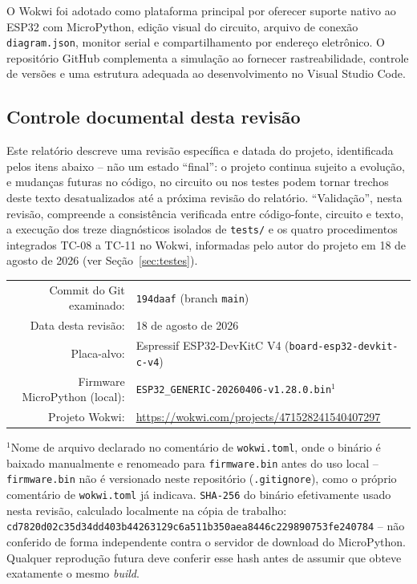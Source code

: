 \documentclass[12pt,a4paper]{article}
\newcommand{\WokwiURL}{https://wokwi.com/projects/471528241540407297}
\newcommand{\RevisionDate}{18 de agosto de 2026}
\newcommand{\RevisionCommit}{194daaf}
\newcommand{\FirmwareFile}{ESP32\_GENERIC-20260406-v1.28.0.bin}
\newcommand{\FirmwareSHA}{cd7820d02c35d34dd403b44263129c6a511b350aea8446c229890753fe240784}
\begin{document}
O Wokwi foi adotado como plataforma principal por oferecer suporte nativo ao ESP32 com MicroPython, edição visual do circuito, arquivo de conexão \texttt{diagram.json}, monitor serial e compartilhamento por endereço eletrônico. O repositório GitHub complementa a simulação ao fornecer rastreabilidade, controle de versões e uma estrutura adequada ao desenvolvimento no Visual Studio Code.

\subsection{Controle documental desta revisão}
\label{sec:controle-documental}

Este relatório descreve uma revisão específica e datada do projeto, identificada pelos itens abaixo -- não um estado \enquote{final}: o projeto continua sujeito a evolução, e mudanças futuras no código, no circuito ou nos testes podem tornar trechos deste texto desatualizados até a próxima revisão do relatório. \enquote{Validação}, nesta revisão, compreende a consistência verificada entre código-fonte, circuito e texto, a execução dos treze diagnósticos isolados de \texttt{tests/} e os quatro procedimentos integrados TC-08 a TC-11 no Wokwi, informadas pelo autor do projeto em 18 de agosto de 2026 (ver Seção~\ref{sec:testes}).

\begin{center}
\begin{tabular}{rl}
  \toprule
  Commit do Git examinado: & \texttt{\RevisionCommit} (branch \texttt{main}) \\
  Data desta revisão: & \RevisionDate \\
  Placa-alvo: & Espressif ESP32-DevKitC V4 (\texttt{board-esp32-devkit-c-v4}) \\
  Firmware MicroPython (local): & \texttt{\FirmwareFile}$^{1}$ \\
  Projeto Wokwi: & \url{\WokwiURL} \\
  \bottomrule
\end{tabular}
\end{center}

\vspace{0.3em}
{\justifying\footnotesize
$^{1}$Nome de arquivo declarado no comentário de \texttt{wokwi.toml}, onde o binário é baixado manualmente e renomeado para \texttt{firmware.bin} antes do uso local -- \texttt{firmware.bin} não é versionado neste repositório (\texttt{.gitignore}), como o próprio comentário de \texttt{wokwi.toml} já indicava. \texttt{SHA-256} do binário efetivamente usado nesta revisão, calculado localmente na cópia de trabalho: \texttt{\FirmwareSHA{}} -- não conferido de forma independente contra o servidor de download do MicroPython. Qualquer reprodução futura deve conferir esse hash antes de assumir que obteve exatamente o mesmo \textit{build}.\par}
\end{document}
